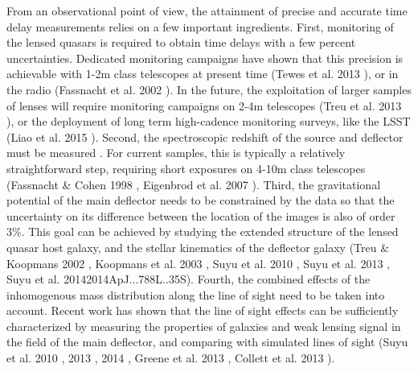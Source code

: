 \documentclass[a4paper,11pt]{article}
\begin{document}
From an observational point of view, the attainment of precise and
accurate time delay measurements relies on a few important
ingredients. First, monitoring of the lensed quasars is required to
obtain time delays with a few percent uncertainties. Dedicated
monitoring campaigns have shown that this precision is achievable with
1-2m class telescopes at present time (Tewes et al. 2013 \citep{2013A&A...556A..22T}), or in the
radio (Fassnacht et al. 2002 \citep{2002ApJ...581..823F}). In the future, the exploitation of
larger samples of lenses will require monitoring campaigns on 2-4m
telescopes
(Treu et al. 2013 \citep{2013arXiv1306.1272T}), or the deployment of long term high-cadence
monitoring surveys, like the LSST
(Liao et al. 2015 \citep{2015ApJ...800...11L}). Second, the spectroscopic redshift of the source and deflector
must be measured . For current samples, this is typically a relatively
straightforward step, requiring short exposures on 4-10m class
telescopes (Fassnacht \& Cohen 1998 \citep{1998AJ....115..377F}, Eigenbrod et al. 2007 \citep{2007A&A...465...51E}).  Third, the
gravitational potential of the main deflector needs to be constrained
by the data so that the uncertainty on its difference between the
location of the images is also of order 3\%. This goal can be achieved
by studying the extended structure of the lensed quasar host galaxy,
and the stellar kinematics of the deflector galaxy
(Treu \& Koopmans 2002 \citep{2002MNRAS.337L...6T}, Koopmans et al. 2003 \citep{2003ApJ...599...70K}, Suyu et al. 2010 \citep{2010ApJ...711..201S}, Suyu et al. 2013 \citep{2013ApJ...766...70S}, Suyu et al. 2014{2014ApJ...788L..35S}). 
Fourth, the combined effects of the inhomogenous mass distribution
along the line of sight need to be taken into account. Recent work has
shown that the line of sight effects can be sufficiently characterized
by measuring the properties of galaxies and weak lensing signal in the
field of the main deflector, and comparing with simulated lines of
sight (Suyu et al. 2010 \citep{2010ApJ...711..201S}, 2013 \citep{2013ApJ...766...70S}, 2014 \citep{2014ApJ...788L..35S}, Greene et al. 2013 \citep{2013ApJ...768...39G}, Collett et al. 2013 \citep{2013MNRAS.432..679C}).
\end{document}
